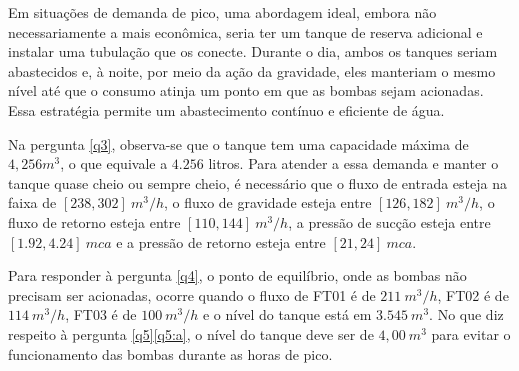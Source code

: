Em situações de demanda de pico, uma abordagem ideal, embora não necessariamente a mais econômica, seria ter um tanque de reserva adicional e instalar uma tubulação que os conecte. Durante o dia, ambos os tanques seriam abastecidos e, à noite, por meio da ação da gravidade, eles manteriam o mesmo nível até que o consumo atinja um ponto em que as bombas sejam acionadas. Essa estratégia permite um abastecimento contínuo e eficiente de água.



%

Na pergunta \ref{q3}, observa-se que o tanque tem uma capacidade máxima de $4,256 m^3$, o que equivale a $4.256$ litros. Para atender a essa demanda e manter o tanque quase cheio ou sempre cheio, é necessário que o fluxo de entrada esteja na faixa de $[238, 302] \ m^3/h$, o fluxo de gravidade esteja entre $[126, 182] \ m^3/h$, o fluxo de retorno esteja entre $[110, 144] \ m^3/h$, a pressão de sucção esteja entre $[1.92, 4.24] \ mca$ e a pressão de retorno esteja entre $[21, 24] \ mca$.

Para responder à pergunta \ref{q4}, o ponto de equilíbrio, onde as bombas não precisam ser acionadas, ocorre quando o fluxo de FT01 é de $211 \ m^3/h$, FT02 é de $114 \ m^3/h$, FT03 é de $100 \ m^3/h$ e o nível do tanque está em $3.545 \ m^3$.
No que diz respeito à pergunta \ref{q5}\ref{q5:a}, o nível do tanque deve ser de $4,00 \ m^3$ para evitar o funcionamento das bombas durante as horas de pico.
